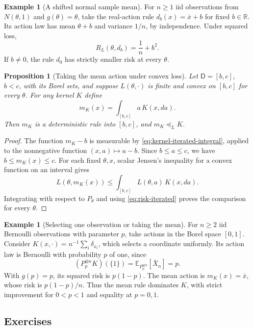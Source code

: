 \documentclass[11pt,oneside]{book}
\newtheorem{proposition}[theorem]{Proposition}
\theoremstyle{definition}
\newtheorem{example}[theorem]{Example}
\theoremstyle{remark}
\newcommand{\R}{\mathbb R}
\begin{document}
\begin{example}[A shifted normal sample mean]
\label{ex:shifted-normal-risk}
For $n\geq1$ iid observations from $N(\theta,1)$ and $g(\theta)=\theta$,
take the real-action rule $d_b(x)=\bar x+b$ for fixed $b\in\R$.
Its action law has mean $\theta+b$ and variance $1/n$, by independence.
Under squared loss,
\[
R_L(\theta,d_b)=\frac1n+b^2.
\]
If $b\ne0$, the rule $d_0$ has strictly smaller risk at every $\theta$.
\end{example}

\begin{proposition}[Taking the mean action under convex loss]
\label{prop:convex-mean-action}
Let $\mathsf D=[b,c]$, $b<c$, with its Borel sets, and suppose
$L(\theta,\cdot)$ is finite and convex on $[b,c]$ for every $\theta$.
For any kernel $K$ define
\[
m_K(x)=\int_{[b,c]}a\,K(x,da).
\]
Then $m_K$ is a deterministic rule into $[b,c]$, and $m_K\preceq_L K$.
\end{proposition}
\begin{proof}
The function $m_K-b$ is measurable by
\eqref{eq:kernel-iterated-integral}, applied to the nonnegative function
$(x,a)\mapsto a-b$. Since $b\leq a\leq c$, we have $b\leq m_K(x)\leq c$.
For each fixed $\theta,x$, scalar Jensen's inequality for a convex
function on an interval gives
\[
L(\theta,m_K(x))\leq\int_{[b,c]}L(\theta,a)\,K(x,da).
\]
Integrating with respect to $P_\theta$ and using
\eqref{eq:risk-iterated} proves the comparison for every $\theta$.
\end{proof}

\begin{example}[Selecting one observation or taking the mean]
\label{ex:random-selection-risk}
For $n\geq2$ iid Bernoulli observations with parameter $p$, take actions
in the Borel space $[0,1]$. Consider $K(x,\cdot)=n^{-1}\sum_i\delta_{x_i}$,
which selects a coordinate uniformly. Its action law is Bernoulli with
probability $p$ of one, since
\[
(P_p^{\otimes n}K)(\{1\})=\mathbb E_{P_p^{\otimes n}}[\bar X_n]=p.
\]
With $g(p)=p$, its squared risk is $p(1-p)$. The mean action is
$m_K(x)=\bar x$, whose risk is $p(1-p)/n$. Thus the mean rule dominates
$K$, with strict improvement for $0<p<1$ and equality at $p=0,1$.
\end{example}

\subsection{Exercises}
\label{subsec:worked-examples-2-2}
\end{document}
